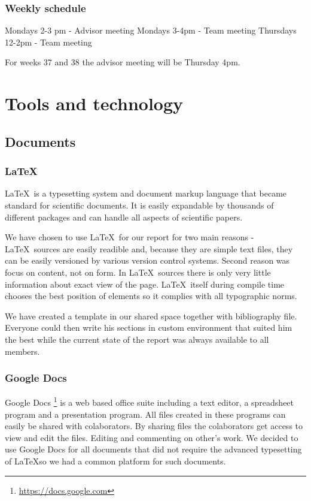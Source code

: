 \documentclass[11pt,a4paper,titlepage,oneside]{report}
\begin{document}
\subsection{Weekly schedule}
Mondays 2-3 pm - Advisor meeting
Mondays 3-4pm - Team meeting
Thursdays 12-2pm - Team meeting

For weeks 37 and 38 the advisor meeting will be Thursday 4pm.

\chapter{Tools and technology}
\section{Documents}

  \subsection{\LaTeX}
  \LaTeX~is a typesetting system and document markup language that became standard for scientific documents. It is easily expandable by thousands of different packages and can handle all aspects of scientific papers.

  We have chosen to use \LaTeX~for our report for two main reasons - \LaTeX~sources are easily readible and, because they are simple text files, they can be easily versioned by various version control systems. Second reason was focus on content, not on form. In \LaTeX~sources there is only very little information about exact view of the page. \LaTeX~itself during compile time chooses the best position of elements so it complies with all typographic norms.

  We have created a template in our shared space together with bibliography file. Everyone could then write his sections in custom environment that suited him the best while the current state of the report was always available to all members.

  \subsection{Google Docs}
  Google Docs \footnote{\url{https://docs.google.com}} is a web based office suite including a text editor, a spreadsheet program and a presentation program. All files created in these programs can easily be shared with colaborators. By sharing files the colaborators get access to view and edit the files. Editing and commenting on other's work. We decided to use Google Docs for all documents that did not require the advanced typesetting of \LaTeX  so we had a common platform for such documents.
\end{document}
